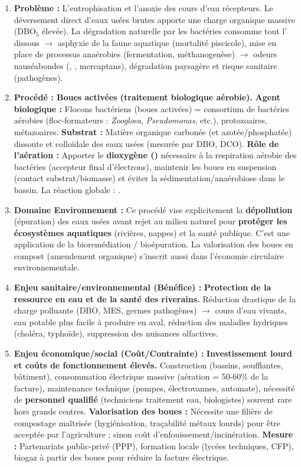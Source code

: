 \documentclass[11pt]{article}
\newcommand{\cle}[1]{{\popxbold\color{popdark}#1}}
\begin{document}
\begin{corrige}
\begin{enumerate}
\item \textbf{Problème :} L'\cle{eutrophisation} et l'\cle{anoxie} des cours d'eau récepteurs. Le déversement direct d'eaux usées brutes apporte une charge organique massive (DBO$_5$ élevée). La dégradation naturelle par les bactéries consomme tout l' dissous $\rightarrow$ asphyxie de la faune aquatique (mortalité piscicole), mise en place de processus anaérobies (fermentation, méthanogenèse) $\rightarrow$ odeurs nauséabondes (, , mercaptans), dégradation paysagère et risque sanitaire (pathogènes).
\item \textbf{Procédé : \cle{Boues activées} (traitement biologique aérobie).} \textbf{Agent biologique :} Flocons bactériens (boues activées) = consortium de bactéries aérobies (floc-formateurs : \emph{Zoogloea}, \emph{Pseudomonas}, etc.), protozoaires, métazoaires. \textbf{Substrat :} Matière organique carbonée (et azotée/phosphatée) dissoute et colloïdale des eaux usées (mesurée par DBO, DCO). \textbf{Rôle de l'aération :} Apporter le \textbf{dioxygène ()} nécessaire à la respiration aérobie des bactéries (accepteur final d'électrons), maintenir les boues en suspension (contact substrat/biomasse) et éviter la sédimentation/anaérobiose dans le bassin. La réaction globale : .
\item \textbf{Domaine Environnement :} Ce procédé vise explicitement la \textbf{dépollution} (épuration) des eaux usées avant rejet au milieu naturel pour \textbf{protéger les écosystèmes aquatiques} (rivières, nappes) et la santé publique. C'est une application de la \cle{bioremédiation} / bioépuration. La valorisation des boues en compost (amendement organique) s'inscrit aussi dans l'économie circulaire environnementale.
\item \textbf{Enjeu sanitaire/environnemental (Bénéfice) :} \textbf{Protection de la ressource en eau et de la santé des riverains.} Réduction drastique de la charge polluante (DBO, MES, germes pathogènes) $\rightarrow$ cours d'eau vivants, eau potable plus facile à produire en aval, réduction des maladies hydriques (choléra, typhoïde), suppression des nuisances olfactives.
\item \textbf{Enjeu économique/social (Coût/Contrainte) :} \textbf{Investissement lourd et coûts de fonctionnement élevés.} Construction (bassins, soufflantes, bâtiment), consommation électrique massive (aération = 50-60\% de la facture), maintenance technique (pompes, électrovannes, automate), nécessité de \textbf{personnel qualifié} (techniciens traitement eau, biologistes) souvent rare hors grands centres. \textbf{Valorisation des boues :} Nécessite une filière de compostage maîtrisée (hygiénisation, traçabilité métaux lourds) pour être acceptée par l'agriculture ; sinon coût d'enfouissement/incinération. \textbf{Mesure :} Partenariats public-privé (PPP), formation locale (lycées techniques, CFP), biogaz à partir des boues pour réduire la facture électrique.

\end{enumerate}
\end{corrige}
\end{document}
